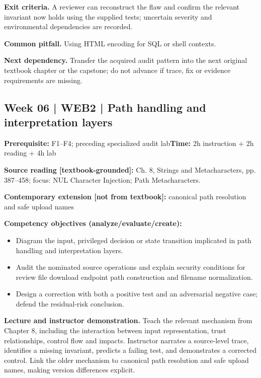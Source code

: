 \documentclass[10pt,letterpaper]{article}
\begin{document}
\textbf{Exit criteria.} A reviewer can reconstruct the flaw and confirm the relevant invariant now holds using the supplied tests; uncertain severity and environmental dependencies are recorded.

\textbf{Common pitfall.} Using HTML encoding for SQL or shell contexts.

\textbf{Next dependency.} Transfer the acquired audit pattern into the next original textbook chapter or the capstone; do not advance if trace, fix or evidence requirements are missing.

\subsection{Week 06 | WEB2 | Path handling and interpretation layers}
\textbf{Prerequisite:} F1--F4; preceding specialized audit lab\hfill\textbf{Time:} 2h instruction + 2h reading + 4h lab

\textbf{Source reading [textbook-grounded]:} Ch. 8, Strings and Metacharacters, pp. 387--458; focus: NUL Character Injection; Path Metacharacters.

\textbf{Contemporary extension [not from textbook]:} canonical path resolution and safe upload names

\textbf{Competency objectives (analyze/evaluate/create):}
\begin{itemize}[leftmargin=*,itemsep=2pt]
\item Diagram the input, privileged decision or state transition implicated in path handling and interpretation layers.
\item Audit the nominated source operations and explain security conditions for review file download endpoint path construction and filename normalization.
\item Design a correction with both a positive test and an adversarial negative case; defend the residual-risk conclusion.
\end{itemize}
\textbf{Lecture and instructor demonstration.} Teach the relevant mechanism from Chapter 8, including the interaction between input representation, trust relationships, control flow and impacts. Instructor narrates a source-level trace, identifies a missing invariant, predicts a failing test, and demonstrates a corrected control. Link the older mechanism to canonical path resolution and safe upload names, making version differences explicit.
\end{document}
